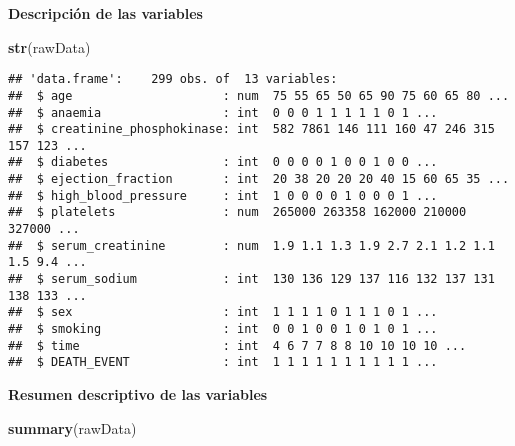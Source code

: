 \documentclass[
]{article}
\newenvironment{Shaded}{\begin{snugshade}}{\end{snugshade}}
\newcommand{\KeywordTok}[1]{\textcolor[rgb]{0.13,0.29,0.53}{\textbf{#1}}}
\newcommand{\NormalTok}[1]{#1}
\begin{document}
\textbf{Descripción de las variables}

\begin{Shaded}
\begin{Highlighting}[]
\KeywordTok{str}\NormalTok{(rawData)}
\end{Highlighting}
\end{Shaded}

\begin{verbatim}
## 'data.frame':    299 obs. of  13 variables:
##  $ age                     : num  75 55 65 50 65 90 75 60 65 80 ...
##  $ anaemia                 : int  0 0 0 1 1 1 1 1 0 1 ...
##  $ creatinine_phosphokinase: int  582 7861 146 111 160 47 246 315 157 123 ...
##  $ diabetes                : int  0 0 0 0 1 0 0 1 0 0 ...
##  $ ejection_fraction       : int  20 38 20 20 20 40 15 60 65 35 ...
##  $ high_blood_pressure     : int  1 0 0 0 0 1 0 0 0 1 ...
##  $ platelets               : num  265000 263358 162000 210000 327000 ...
##  $ serum_creatinine        : num  1.9 1.1 1.3 1.9 2.7 2.1 1.2 1.1 1.5 9.4 ...
##  $ serum_sodium            : int  130 136 129 137 116 132 137 131 138 133 ...
##  $ sex                     : int  1 1 1 1 0 1 1 1 0 1 ...
##  $ smoking                 : int  0 0 1 0 0 1 0 1 0 1 ...
##  $ time                    : int  4 6 7 7 8 8 10 10 10 10 ...
##  $ DEATH_EVENT             : int  1 1 1 1 1 1 1 1 1 1 ...
\end{verbatim}

\textbf{Resumen descriptivo de las variables}

\begin{Shaded}
\begin{Highlighting}[]
\KeywordTok{summary}\NormalTok{(rawData)}
\end{Highlighting}
\end{Shaded}
\end{document}
